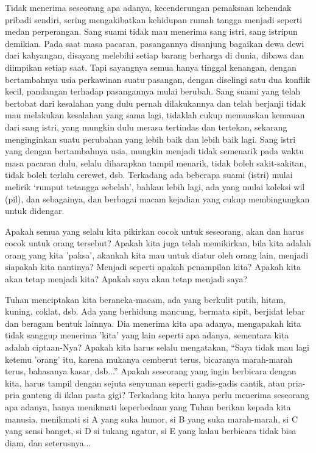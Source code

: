 Tidak menerima seseorang apa adanya, kecenderungan pemaksaan kehendak pribadi sendiri, sering mengakibatkan kehidupan rumah tangga menjadi seperti medan perperangan. Sang suami tidak mau menerima sang istri, sang istripun demikian. Pada saat masa pacaran, pasangannya disanjung bagaikan dewa dewi dari kahyangan, disayang melebihi setiap barang berharga di dunia, dibawa dan diimpikan setiap saat. Tapi sayangnya semua hanya tinggal kenangan, dengan bertambahnya usia perkawinan suatu pasangan, dengan diselingi satu dua konflik kecil, pandangan terhadap pasangannya mulai berubah. Sang suami yang telah bertobat dari kesalahan yang dulu pernah dilakukannya dan telah berjanji tidak mau melakukan kesalahan yang sama lagi, tidaklah cukup memuaskan kemauan dari sang istri, yang mungkin dulu merasa tertindas dan tertekan, sekarang menginginkan suatu perubahan yang lebih baik dan lebih baik lagi. Sang istri yang dengan bertambahnya usia, mungkin menjadi tidak semenarik pada waktu masa pacaran dulu, selalu diharapkan tampil menarik, tidak boleh sakit-sakitan, tidak boleh terlalu cerewet, dsb. Terkadang ada beberapa suami (istri) mulai melirik ‘rumput tetangga sebelah’, bahkan lebih lagi, ada yang mulai koleksi wil (pil), dan sebagainya, dan berbagai macam kejadian yang cukup membingungkan untuk didengar.

Apakah semua yang selalu kita pikirkan cocok untuk seseorang, akan dan harus cocok untuk orang tersebut? Apakah kita juga telah memikirkan, bila kita adalah orang yang kita 'paksa', akankah kita mau untuk diatur oleh orang lain, menjadi siapakah kita nantinya? Menjadi seperti apakah penampilan kita? Apakah kita akan tetap menjadi kita? Apakah saya akan tetap menjadi saya?

Tuhan menciptakan kita beraneka-macam, ada yang berkulit putih, hitam, kuning, coklat, dsb. Ada yang berhidung mancung, bermata sipit, berjidat lebar dan beragam bentuk lainnya. Dia menerima kita apa adanya, mengapakah kita tidak sanggup menerima 'kita' yang lain seperti apa adanya, sementara kita adalah ciptaan-Nya? Apakah kita harus selalu mengatakan, ``Saya tidak mau lagi ketemu 'orang' itu, karena mukanya cemberut terus, bicaranya marah-marah terus, bahasanya kasar, dsb...'' Apakah seseorang yang ingin berbicara dengan kita, harus tampil dengan sejuta senyuman seperti gadis-gadis cantik, atau pria-pria ganteng di iklan pasta gigi? Terkadang kita hanya perlu menerima seseorang apa adanya, hanya menikmati keperbedaan yang Tuhan berikan kepada kita manusia, menikmati si A yang suka humor, si B yang suka marah-marah, si C yang sensi banget, si D si tukang ngatur, si E yang kalau berbicara tidak bisa diam, dan seterusnya...

